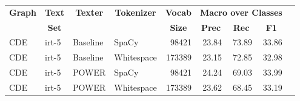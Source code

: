 \begin{tabular}{| l | l | l | l | r | r | r | r | r |}
    \hline

    \multicolumn{1}{|c|}{\textbf{Graph}} &
    \multicolumn{1}{|c|}{\textbf{Text}} &
    \multicolumn{1}{|c|}{\textbf{Texter}} &
    \multicolumn{1}{|c|}{\textbf{Tokenizer}} &
    \multicolumn{1}{|c|}{\textbf{Vocab}} &
    \multicolumn{3}{|c|}{\textbf{Macro over Classes}} \\

    \multicolumn{1}{|c|}{} &
    \multicolumn{1}{|c|}{\textbf{Set}} &
    \multicolumn{1}{|c|}{} &
    \multicolumn{1}{|c|}{} &
    \multicolumn{1}{|c|}{\textbf{Size}} &
    \multicolumn{1}{|c|}{\textbf{Prec}} &
    \multicolumn{1}{|c|}{\textbf{Rec}} &
    \multicolumn{1}{|c|}{\textbf{F1}} \\

    \hline \hline

    CDE & irt-5 & Baseline & SpaCy & \num{98421} &
    23.84 & 73.89 & 33.86 \\

    CDE & irt-5 & Baseline & Whitespace & \num{173389} &
    23.15 & 72.85 & 32.98 \\

    CDE & irt-5 & POWER & SpaCy & \num{98421} & 
    24.24 & 69.03 & 33.99 \\

    CDE & irt-5 & POWER & Whitespace & \num{173389} &
    23.62 & 68.45 & 33.19 \\

    \hline
\end{tabular}
